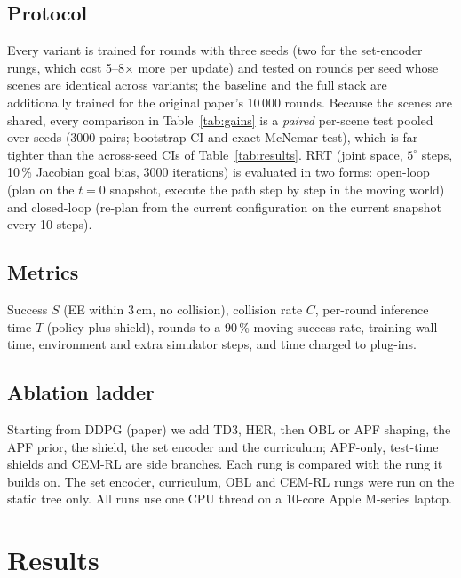 \documentclass[conference]{IEEEtran}
\begin{document}
\subsection{Protocol}
Every variant is trained for \ntrain{} rounds with three seeds (two for the set-encoder rungs, which cost 5--8$\times$ more per update) and tested on \neval{} rounds per seed whose scenes are identical across variants; the baseline and the full stack are additionally trained for the original paper's 10\,000 rounds. Because the scenes are shared, every comparison in Table~\ref{tab:gains} is a \emph{paired} per-scene test pooled over seeds (3000 pairs; bootstrap CI and exact McNemar test), which is far tighter than the across-seed CIs of Table~\ref{tab:results}. RRT (joint space, $5^\circ$ steps, 10\,\% Jacobian goal bias, 3000 iterations) is evaluated in two forms: open-loop (plan on the $t{=}0$ snapshot, execute the path step by step in the moving world) and closed-loop (re-plan from the current configuration on the current snapshot every 10 steps). 
\subsection{Metrics}
Success $S$ (EE within 3\,cm, no collision), collision rate $C$, per-round inference time $T$ (policy plus shield), rounds to a 90\,\% moving success rate, training wall time, environment and extra simulator steps, and time charged to plug-ins. 
\subsection{Ablation ladder}
Starting from DDPG (paper) we add TD3, HER, then OBL or APF shaping, the APF prior, the shield, the set encoder and the curriculum; APF-only, test-time shields and CEM-RL are side branches. Each rung is compared with the rung it builds on. The set encoder, curriculum, OBL and CEM-RL rungs were run on the static tree only. All runs use one CPU thread on a 10-core Apple M-series laptop.

\section{Results}\label{sec:results}

\end{document}
